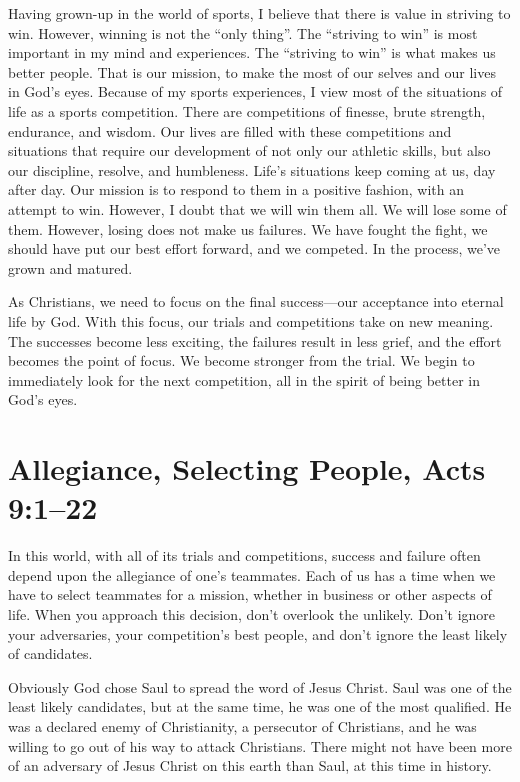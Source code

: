 \documentclass[12pt]{memoir}
\begin{document}
Having grown-up in the world of sports, I believe that there is value
in striving to win. However, winning is not the ``only thing''.
The ``striving to win'' is most important in my mind and experiences.
The ``striving to win'' is what makes us better people. That is
our mission, to make the most of our selves and our lives in God's
eyes. Because of my sports experiences, I view most of the situations
of life as a sports competition. There are competitions of finesse,
brute strength, endurance, and wisdom. Our lives are filled with these
competitions and situations that require our development of not only
our athletic skills, but also our discipline, resolve, and humbleness.
Life's situations keep coming at us, day after day. Our mission is
to respond to them in a positive fashion, with an attempt to win.
However, I doubt that we will win them all. We will lose some of them.
However, losing does not make us failures. We have fought the fight,
we should have put our best effort forward, and we competed. In the
process, we've grown and matured.

As Christians, we need to focus on the final success---our acceptance
into eternal life by God. With this focus, our trials and competitions
take on new meaning. The successes become less exciting, the failures
result in less grief, and the effort becomes the point of focus. We
become stronger from the trial. We begin to immediately look for the
next competition, all in the spirit of being better in God's eyes.

\section{Allegiance, Selecting People, Acts 9:1--22}

In this world, with all of its trials and competitions, success and
failure often depend upon the allegiance of one's teammates. Each
of us has a time when we have to select teammates for a mission, whether
in business or other aspects of life. When you approach this decision,
don't overlook the unlikely. Don't ignore your adversaries, your competition's
best people, and don't ignore the least likely of candidates.

Obviously God chose Saul to spread the word of Jesus Christ. Saul
was one of the least likely candidates, but at the same time, he was
one of the most qualified. He was a declared enemy of Christianity,
a persecutor of Christians, and he was willing to go out of his way
to attack Christians. There might not have been more of an adversary
of Jesus Christ on this earth than Saul, at this time in history.
\end{document}
